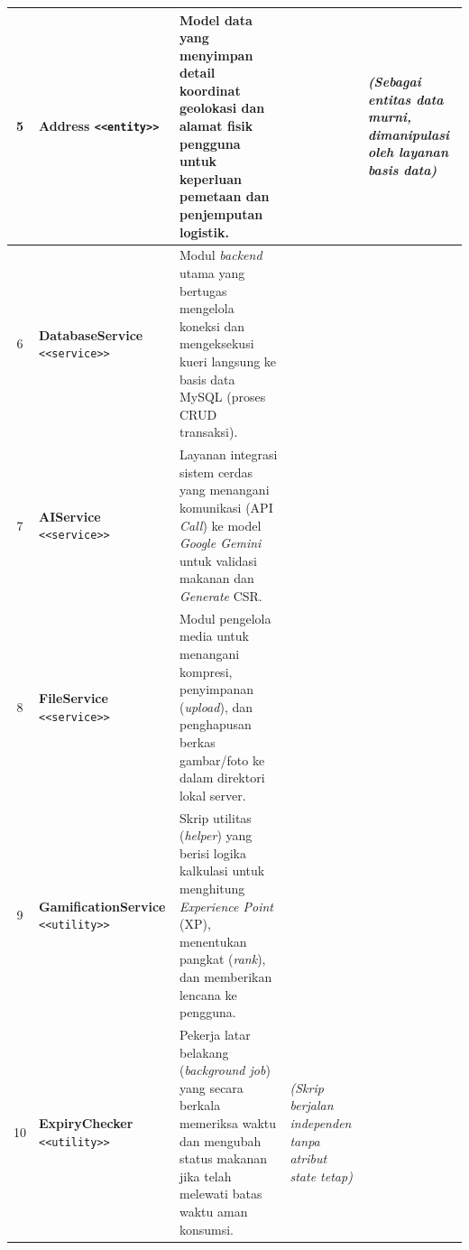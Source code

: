 \begin{xltabular}{\textwidth}{|c|L|L|L|L|}
    5 & \textbf{Address} \newline \texttt{<<entity>>} & Model data yang menyimpan detail koordinat geolokasi dan alamat fisik pengguna untuk keperluan pemetaan dan penjemputan logistik. &  & \textit{(Sebagai entitas data murni, dimanipulasi oleh layanan basis data)} \\
    \hline

    6 & \textbf{DatabaseService} \newline \texttt{<<service>>} & Modul \textit{backend} utama yang bertugas mengelola koneksi dan mengeksekusi kueri langsung ke basis data MySQL (proses CRUD transaksi). &  &  \\
    \hline

    7 & \textbf{AIService} \newline \texttt{<<service>>} & Layanan integrasi sistem cerdas yang menangani komunikasi (API \textit{Call}) ke model \textit{Google Gemini} untuk validasi makanan dan \textit{Generate} CSR. &  &  \\
    \hline

    8 & \textbf{FileService} \newline \texttt{<<service>>} & Modul pengelola media untuk menangani kompresi, penyimpanan (\textit{upload}), dan penghapusan berkas gambar/foto ke dalam direktori lokal server. &  &  \\
    \hline

    9 & \textbf{GamificationService} \newline \texttt{<<utility>>} & Skrip utilitas (\textit{helper}) yang berisi logika kalkulasi untuk menghitung \textit{Experience Point} (XP), menentukan pangkat (\textit{rank}), dan memberikan lencana ke pengguna. &  &  \\
    \hline

    10 & \textbf{ExpiryChecker} \newline \texttt{<<utility>>} & Pekerja latar belakang (\textit{background job}) yang secara berkala memeriksa waktu dan mengubah status makanan jika telah melewati batas waktu aman konsumsi. & \textit{(Skrip berjalan independen tanpa atribut state tetap)} &  \\
    \hline


\end{xltabular}
